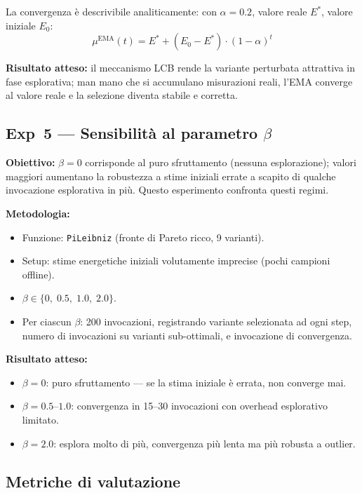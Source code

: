 \documentclass[a4paper,11pt]{article}
\begin{document}
La convergenza è descrivibile analiticamente: con $\alpha = 0.2$, valore reale $E^*$,
valore iniziale $E_0$:
\[
  \mu^{\text{EMA}}(t) = E^* + (E_0 - E^*) \cdot (1-\alpha)^t
\]

\textbf{Risultato atteso:} il meccanismo LCB rende la variante perturbata attrattiva
in fase esplorativa; man mano che si accumulano misurazioni reali, l'EMA converge al
valore reale e la selezione diventa stabile e corretta.

\subsection{Exp~5 --- Sensibilità al parametro
  \texorpdfstring{$\beta$}{beta}}

\textbf{Obiettivo:} $\beta = 0$ corrisponde al puro sfruttamento (nessuna esplorazione);
valori maggiori aumentano la robustezza a stime iniziali errate a scapito di qualche
invocazione esplorativa in più. Questo esperimento confronta questi regimi.

\medskip
\textbf{Metodologia:}
\begin{itemize}
  \item Funzione: \texttt{PiLeibniz} (fronte di Pareto ricco, 9 varianti).
  \item Setup: stime energetiche iniziali volutamente imprecise (pochi campioni
    offline).
  \item $\beta \in \{0,\; 0.5,\; 1.0,\; 2.0\}$.
  \item Per ciascun $\beta$: 200 invocazioni, registrando variante selezionata ad ogni
    step, numero di invocazioni su varianti sub-ottimali, e invocazione di convergenza.
\end{itemize}

\textbf{Risultato atteso:}
\begin{itemize}
  \item $\beta = 0$: puro sfruttamento --- se la stima iniziale è errata, non converge
    mai.
  \item $\beta = 0.5$--$1.0$: convergenza in 15--30 invocazioni con overhead
    esplorativo limitato.
  \item $\beta = 2.0$: esplora molto di più, convergenza più lenta ma più robusta a
    outlier.
\end{itemize}

\subsection{Metriche di valutazione}
\end{document}
